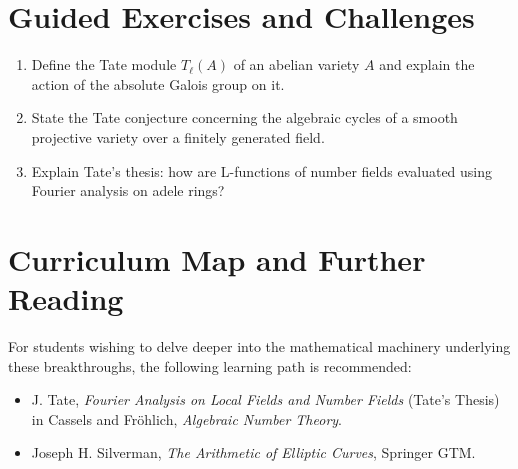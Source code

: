 \section{Guided Exercises and Challenges}
\begin{enumerate}[label=\textbf{\arabic*.}]
  \item Define the Tate module $T_\ell(A)$ of an abelian variety $A$ and explain the action of the absolute Galois group on it.
  \item State the Tate conjecture concerning the algebraic cycles of a smooth projective variety over a finitely generated field.
  \item Explain Tate's thesis: how are L-functions of number fields evaluated using Fourier analysis on adele rings?
\end{enumerate}

\section{Curriculum Map and Further Reading}
For students wishing to delve deeper into the mathematical machinery underlying these breakthroughs, the following learning path is recommended:
\begin{itemize}
  \item J. Tate, \emph{Fourier Analysis on Local Fields and Number Fields} (Tate's Thesis) in Cassels and Fr\"ohlich, \emph{Algebraic Number Theory}.
  \item Joseph H. Silverman, \emph{The Arithmetic of Elliptic Curves}, Springer GTM.
\end{itemize}

